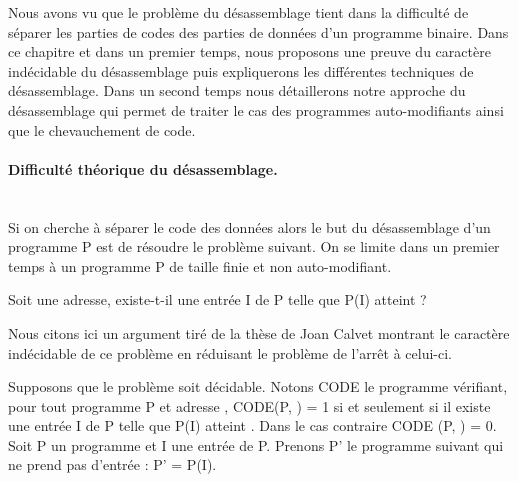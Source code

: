 Nous avons vu que le problème du désassemblage tient dans la difficulté de séparer les parties de codes des parties de données d'un programme binaire.
Dans ce chapitre et dans un premier temps, nous proposons une preuve du caractère indécidable du désassemblage puis expliquerons les différentes techniques de désassemblage. Dans un second temps nous détaillerons notre approche du désassemblage qui permet de traiter le cas des programmes auto-modifiants ainsi que le chevauchement de code.


\paragraph{Difficulté théorique du désassemblage.}
~\\
Si on cherche à séparer le code des données alors le but du désassemblage d'un programme P est de résoudre le problème suivant. On se limite dans un premier temps à un programme P de taille finie et non auto-modifiant.
\begin{pb}
Soit  une adresse, existe-t-il une entrée I de P telle que P(I) atteint  ?
\end{pb}


Nous citons ici un argument tiré de la thèse de Joan Calvet \cite{Calvet2013} montrant le caractère indécidable de ce problème en réduisant le problème de l'arrêt à celui-ci.

Supposons que le problème soit décidable. Notons CODE le programme vérifiant, pour tout programme P et adresse , CODE(P, ) = 1 si et seulement si il existe une entrée I de P telle que P(I) atteint . Dans le cas contraire CODE (P, ) = 0.
Soit P un programme et I une entrée de P. Prenons P' le programme suivant qui ne prend pas d'entrée : P' = P(I).

